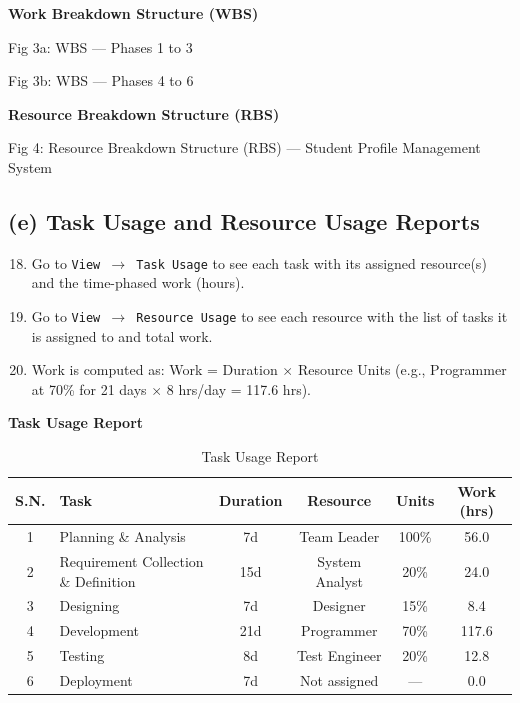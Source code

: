 \documentclass[10pt,a4paper]{article}
\begin{document}
\noindent\textbf{Work Breakdown Structure (WBS)}

Fig 3a: WBS --- Phases 1 to 3

Fig 3b: WBS --- Phases 4 to 6

\noindent\textbf{Resource Breakdown Structure (RBS)}

Fig 4: Resource Breakdown Structure (RBS) --- Student Profile Management System

\subsection*{(e) Task Usage and Resource Usage Reports}

\begin{enumerate}[nosep]
    \setcounter{enumi}{17}
    \item Go to \texttt{View $\to$ Task Usage} to see each task with its assigned resource(s) and the time-phased work (hours).
    \item Go to \texttt{View $\to$ Resource Usage} to see each resource with the list of tasks it is assigned to and total work.
    \item Work is computed as: Work = Duration $\times$ Resource Units (e.g., Programmer at 70\% for 21 days $\times$ 8 hrs/day = 117.6 hrs).
\end{enumerate}

\vspace{0.2cm}
\noindent\textbf{Task Usage Report}

\begin{table}[h!]
\centering
\renewcommand{\arraystretch}{1.15}
\begin{tabular}{|c|l|c|c|c|c|}
\hline
\textbf{S.N.} & \textbf{Task} & \textbf{Duration} & \textbf{Resource} & \textbf{Units} & \textbf{Work (hrs)} \\ \hline
1 & Planning \& Analysis & 7d & Team Leader & 100\% & 56.0 \\ \hline
2 & Requirement Collection \& Definition & 15d & System Analyst & 20\% & 24.0 \\ \hline
3 & Designing & 7d & Designer & 15\% & 8.4 \\ \hline
4 & Development & 21d & Programmer & 70\% & 117.6 \\ \hline
5 & Testing & 8d & Test Engineer & 20\% & 12.8 \\ \hline
6 & Deployment & 7d & Not assigned & --- & 0.0 \\ \hline
\end{tabular}
\caption*{Task Usage Report}
\end{table}
\end{document}
